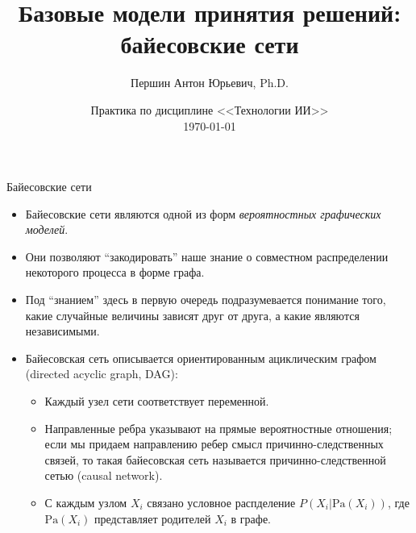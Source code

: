 \documentclass{beamer}
\title{Базовые модели принятия решений:\\байесовские сети}
\date[\today]{Практика по дисциплине <<Технологии ИИ>>\\\today}
\author[Anton]{Першин Антон Юрьевич, Ph.D.}
\institute{Программа <<Большие данные и распределенная цифровая платформа>>\\Санкт-Петербургский государственный университет}
\begin{document}
\begin{frame}
\titlepage
\end{frame}

\setcounter{framenumber}{0}

\section{}

\begin{frame}{Байесовские сети}
    \small

    \begin{itemize}
        \item Байесовские сети являются одной из форм \emph{вероятностных графических моделей}.
        \item Они позволяют ``закодировать'' наше знание о совместном распределении некоторого процесса в форме графа.
        \item Под ``знанием'' здесь в первую очередь подразумевается понимание того, какие случайные величины зависят друг от друга, а какие являются независимыми.
        \item Байесовская сеть описывается ориентированным ациклическим графом (directed acyclic graph, DAG):
        \begin{itemize}
            \item Каждый узел сети соответствует переменной.
            \item Направленные ребра указывают на прямые вероятностные отношения; если мы придаем направлению ребер смысл причинно-следственных связей, то такая байесовская сеть называется причинно-следственной сетью (causal network).
            \item С каждым узлом $X_i$ связано условное распделение $P(X_i | \text{Pa}(X_i))$, где $\text{Pa}(X_i)$ представляет родителей $X_i$ в графе.
        \end{itemize}
    \end{itemize}
\end{frame}
\end{document}
